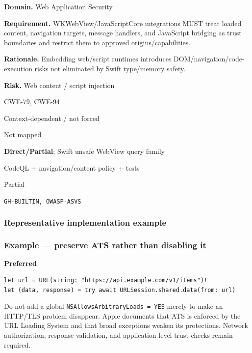 \documentclass[10pt,letterpaper]{article}
\newcommand{\code}[1]{\texttt{\small #1}}
\newcommand{\prioritybadge}[2]{\tcbox[on line,boxrule=0pt,arc=1.2mm,boxsep=0.7mm,left=1mm,right=1mm,top=0.4mm,bottom=0.4mm,colback=#2!12,coltext=#2]{\scriptsize\bfseries #1}}
\begin{document}
\begin{rulebox}[title={\texttt{SCS-SWIFT-WEB-001} \hfill \prioritybadge{High Priority}{High}}]
\textbf{Domain.} Web Application Security

\textbf{Requirement.} WKWebView/JavaScriptCore integrations MUST treat loaded content, navigation targets, message handlers, and JavaScript bridging as trust boundaries and restrict them to approved origins/capabilities.

\textbf{Rationale.} Embedding web/script runtimes introduces DOM/navigation/code-execution risks not eliminated by Swift type/memory safety.

\textbf{Risk.} Web content / script injection

\begin{description}[leftmargin=2.65cm,labelwidth=2.3cm,style=nextline,itemsep=1pt,topsep=3pt]
  \item[CWE] CWE-79, CWE-94
  \item[OWASP] Context-dependent / not forced
  \item[CERT] Not mapped
  \item[CodeQL] \textbf{Direct/Partial}; Swift unsafe WebView query family
  \item[Enforcement] CodeQL + navigation/content policy + tests
  \item[Automation] Partial
  \item[Sources] \texttt{GH-BUILTIN, OWASP-ASVS}
\end{description}
\end{rulebox}
\subsubsection*{Representative implementation example}
\subsubsection*{Example --- preserve ATS rather than disabling it}

\textbf{Preferred}\par
\begin{lstlisting}
let url = URL(string: "https://api.example.com/v1/items")!
let (data, response) = try await URLSession.shared.data(from: url)
\end{lstlisting}

Do not add a global \code{NSAllowsArbitraryLoads = YES} merely to make an HTTP/TLS problem disappear. Apple documents that ATS is enforced by the URL Loading System and that broad exceptions weaken its protections. Network authorization, response validation, and application-level trust checks remain required.\par
\end{document}
